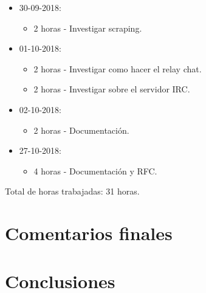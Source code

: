 \documentclass{article}
\begin{document}
\begin{itemize}
\begin{itemize}
  \end{itemize}
  \item 30-09-2018:
  \begin{itemize}
    \item 2 horas - Investigar scraping.
  \end{itemize}
  \item 01-10-2018:
  \begin{itemize}
    \item 2 horas - Investigar como hacer el relay chat.
    \item 2 horas - Investigar sobre el servidor IRC.
  \end{itemize}
  \item 02-10-2018:
  \begin{itemize}
    \item 2 horas - Documentaci\'on.
  \end{itemize}
  \item 27-10-2018:
  \begin{itemize}
    \item 4 horas - Documentaci\'on y RFC.
  \end{itemize}
\end{itemize}
Total de horas trabajadas: 31 horas.

\section{Comentarios finales}
\section{Conclusiones}
\end{document}
